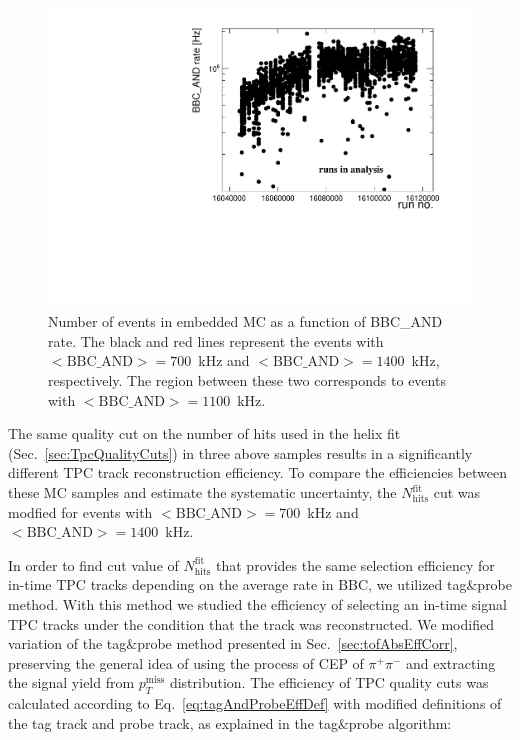 \begin{figure}[H]%
	\centering
	\parbox{0.4725\textwidth}{%
		\centering%
		\hspace*{-28pt}\includegraphics[width=1.2\linewidth,page=5]{graphics/systematicsEfficiency/bbc_and/Out.pdf}%
	} 
	\quad
	\parbox{0.4725\textwidth}{ 
		\centering
			\caption[Number of events in embedded MC as a function of BBC\_AND rate.]
    {Number of events in embedded MC as a function of BBC\_AND rate. The black and red lines represent the events with \mbox{$<\text{BBC\_AND}>=700$~kHz} and \mbox{$<\text{BBC\_AND}>=1400$~kHz},  respectively. The region between these two corresponds to events with \mbox{$<\text{BBC\_AND}>=1100$~kHz}.}
    \label{fig:events_bbc_and}%
	}%
\end{figure}\vspace{-10pt}


The same quality cut on the number of hits used in the helix fit (Sec.~\ref{sec:TpcQualityCuts}) in three above samples results in a significantly different TPC track reconstruction efficiency. To compare the efficiencies between these MC samples and estimate the systematic uncertainty, the $N_{\text{hits}}^{\text{fit}}$ cut was modfied for events with \mbox{$<\text{BBC\_AND}>=700$~kHz} and \mbox{$<\text{BBC\_AND}>=1400$~kHz}.


In order to find cut value of $N_{\text{hits}}^{\text{fit}}$ that provides the same selection efficiency for in-time TPC tracks depending on the average rate in BBC, we utilized tag\&probe method. With this method we studied the efficiency of selecting an in-time signal TPC tracks under the condition that the track was reconstructed. We modified variation of the tag\&probe method presented in Sec.~\ref{sec:tofAbsEffCorr}, preserving the general idea of using the process of CEP of $\pi^{+}\pi^{-}$ and extracting the signal yield from $p_{T}^{\text{miss}}$ distribution. The efficiency of TPC quality cuts was calculated according to Eq.~\eqref{eq:tagAndProbeEffDef} with modified definitions of the tag track and probe track, as explained in the tag\&probe algorithm:

